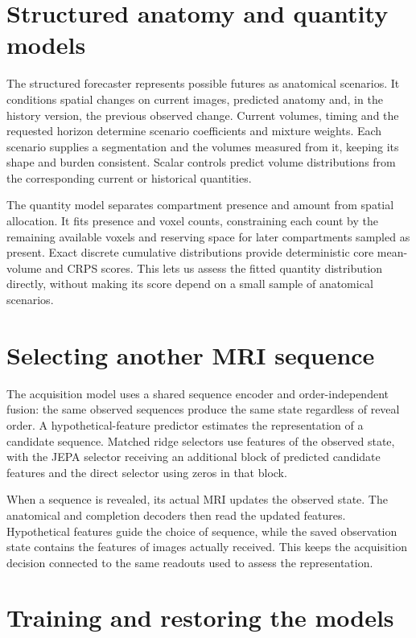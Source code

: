\section{Structured anatomy and quantity models}

The structured forecaster represents possible futures as anatomical scenarios. It conditions spatial changes on current images, predicted anatomy and, in the history version, the previous observed change. Current volumes, timing and the requested horizon determine scenario coefficients and mixture weights. Each scenario supplies a segmentation and the volumes measured from it, keeping its shape and burden consistent. Scalar controls predict volume distributions from the corresponding current or historical quantities.

The quantity model separates compartment presence and amount from spatial allocation. It fits presence and voxel counts, constraining each count by the remaining available voxels and reserving space for later compartments sampled as present. Exact discrete cumulative distributions provide deterministic core mean-volume and CRPS scores. This lets us assess the fitted quantity distribution directly, without making its score depend on a small sample of anatomical scenarios.

\section{Selecting another MRI sequence}

The acquisition model uses a shared sequence encoder and order-independent fusion: the same observed sequences produce the same state regardless of reveal order. A hypothetical-feature predictor estimates the representation of a candidate sequence. Matched ridge selectors use features of the observed state, with the JEPA selector receiving an additional block of predicted candidate features and the direct selector using zeros in that block.

When a sequence is revealed, its actual MRI updates the observed state. The anatomical and completion decoders then read the updated features. Hypothetical features guide the choice of sequence, while the saved observation state contains the features of images actually received. This keeps the acquisition decision connected to the same readouts used to assess the representation.

\section{Training and restoring the models}

